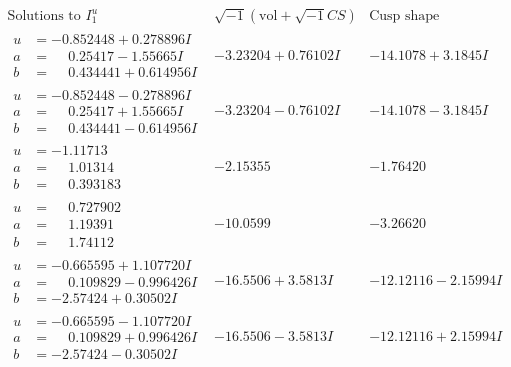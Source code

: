 \documentclass[1p]{elsarticle_modified}
\theoremstyle{definition}
\newcommand{\I}{\sqrt{-1}}
\begin{document}
$$\begin{array}{c|c|c}  
\text{Solutions to }I^u_{1}& \I (\text{vol} + \sqrt{-1}CS) & \text{Cusp shape}\\
 \hline 
\begin{aligned}
u &= -0.852448 + 0.278896 I \\
a &= \phantom{-}0.25417 - 1.55665 I \\
b &= \phantom{-}0.434441 + 0.614956 I\end{aligned}
 & -3.23204 + 0.76102 I & -14.1078 + 3.1845 I \\ \hline\begin{aligned}
u &= -0.852448 - 0.278896 I \\
a &= \phantom{-}0.25417 + 1.55665 I \\
b &= \phantom{-}0.434441 - 0.614956 I\end{aligned}
 & -3.23204 - 0.76102 I & -14.1078 - 3.1845 I \\ \hline\begin{aligned}
u &= -1.11713\phantom{ +0.000000I} \\
a &= \phantom{-}1.01314\phantom{ +0.000000I} \\
b &= \phantom{-}0.393183\phantom{ +0.000000I}\end{aligned}
 & -2.15355\phantom{ +0.000000I} & -1.76420\phantom{ +0.000000I} \\ \hline\begin{aligned}
u &= \phantom{-}0.727902\phantom{ +0.000000I} \\
a &= \phantom{-}1.19391\phantom{ +0.000000I} \\
b &= \phantom{-}1.74112\phantom{ +0.000000I}\end{aligned}
 & -10.0599\phantom{ +0.000000I} & -3.26620\phantom{ +0.000000I} \\ \hline\begin{aligned}
u &= -0.665595 + 1.107720 I \\
a &= \phantom{-}0.109829 - 0.996426 I \\
b &= -2.57424 + 0.30502 I\end{aligned}
 & -16.5506 + 3.5813 I & -12.12116 - 2.15994 I \\ \hline\begin{aligned}
u &= -0.665595 - 1.107720 I \\
a &= \phantom{-}0.109829 + 0.996426 I \\
b &= -2.57424 - 0.30502 I\end{aligned}
 & -16.5506 - 3.5813 I & -12.12116 + 2.15994 I \\ \hline\begin{aligned}

\end{aligned}
\end{array}$$
\end{document}
